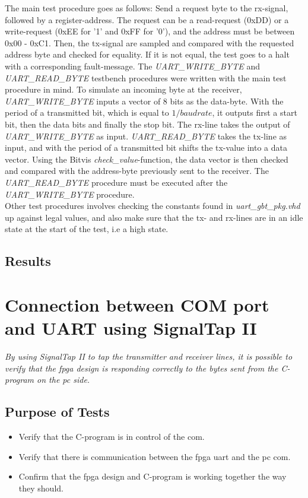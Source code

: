 \documentclass[main.tex]{subfiles}
\begin{document}
The main test procedure goes as follows: Send a request byte to the rx-signal, followed by a register-address. The request can be a read-request (0xDD) or a write-request (0xEE for '1' and 0xFF for '0'), and the address must be between 0x00 - 0xC1. Then, the tx-signal are sampled and compared with the requested address byte and checked for equality. If it is not equal, the test goes to a halt with a corresponding fault-message. The \textit{UART\_WRITE\_BYTE} and \textit{UART\_READ\_BYTE} testbench procedures were written with the main test procedure in mind. To simulate an incoming byte at the receiver, \textit{UART\_WRITE\_BYTE} inputs a vector of 8 bits as the data-byte. With the period of a transmitted bit, which is equal to $1/baud rate$, it outputs first a start bit, then the data bits and finally the stop bit. The rx-line takes the output of \textit{UART\_WRITE\_BYTE} as input. \textit{UART\_READ\_BYTE} takes the tx-line as input, and with the period of a transmitted bit shifts the tx-value into a data vector. Using the Bitvis \textit{check\_value}-function, the data vector is then checked and compared with the address-byte previously sent to the receiver. The \textit{UART\_READ\_BYTE} procedure must be executed after the \textit{UART\_WRITE\_BYTE} procedure. \\

Other test procedures involves checking the constants found in \textit{uart\_gbt\_pkg.vhd} up against legal values, and also make sure that the tx- and rx-lines are in an idle state at the start of the test, i.e a high state.

\subsection{Results}

\section{Connection between COM port and UART using SignalTap II}

\textit{By using SignalTap II to tap the transmitter and receiver lines, it is possible to verify that the \gls{fpga} design is responding correctly to the bytes sent from the C-program on the \gls{pc} side.} 

\subsection{Purpose of Tests}
\begin{itemize}\setlength{\itemsep}{10pt}
\item Verify that the C-program is in control of the \gls{com}.
\item Verify that there is communication between the \gls{fpga} \gls{uart} and the \gls{pc} \gls{com}.
\item Confirm that the \gls{fpga} design and C-program is working together the way they should.
\end{itemize}
\end{document}
